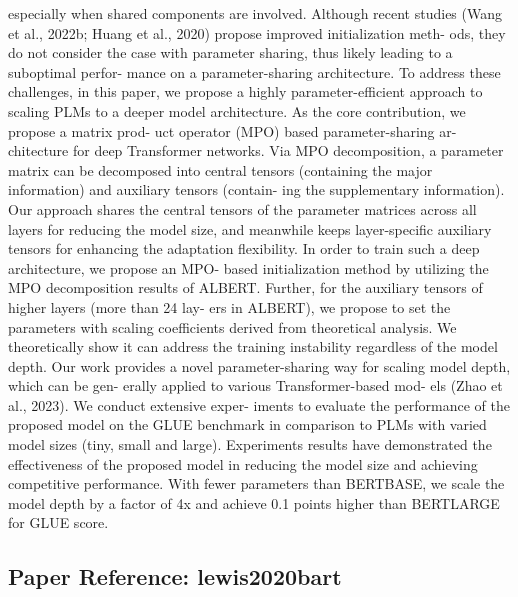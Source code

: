 especially when shared components are involved. Although recent studies (Wang et al., 2022b; Huang et al., 2020) propose improved initialization meth- ods, they do not consider the case with parameter sharing, thus likely leading to a suboptimal perfor- mance on a parameter-sharing architecture. To address these challenges, in this paper, we propose a highly parameter-efficient approach to scaling PLMs to a deeper model architecture. As the core contribution, we propose a matrix prod- uct operator (MPO) based parameter-sharing ar- chitecture for deep Transformer networks. Via MPO decomposition, a parameter matrix can be decomposed into central tensors (containing the major information) and auxiliary tensors (contain- ing the supplementary information). Our approach shares the central tensors of the parameter matrices across all layers for reducing the model size, and meanwhile keeps layer-specific auxiliary tensors for enhancing the adaptation flexibility. In order to train such a deep architecture, we propose an MPO- based initialization method by utilizing the MPO decomposition results of ALBERT. Further, for the auxiliary tensors of higher layers (more than 24 lay- ers in ALBERT), we propose to set the parameters with scaling coefficients derived from theoretical analysis. We theoretically show it can address the training instability regardless of the model depth. Our work provides a novel parameter-sharing way for scaling model depth, which can be gen- erally applied to various Transformer-based mod- els (Zhao et al., 2023). We conduct extensive exper- iments to evaluate the performance of the proposed model on the GLUE benchmark in comparison to PLMs with varied model sizes (tiny, small and large). Experiments results have demonstrated the effectiveness of the proposed model in reducing the model size and achieving competitive performance. With fewer parameters than BERTBASE, we scale the model depth by a factor of 4x and achieve 0.1 points higher than BERTLARGE for GLUE score.

\vspace{18pt}


\subsection*{Paper Reference: lewis2020bart}

